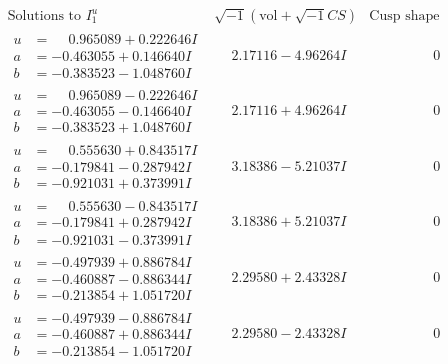\documentclass[1p]{elsarticle_modified}
\theoremstyle{definition}
\newcommand{\I}{\sqrt{-1}}
\begin{document}
$$\begin{array}{c|c|c}  
\text{Solutions to }I^u_{1}& \I (\text{vol} + \sqrt{-1}CS) & \text{Cusp shape}\\
 \hline 
\begin{aligned}
u &= \phantom{-}0.965089 + 0.222646 I \\
a &= -0.463055 + 0.146640 I \\
b &= -0.383523 - 1.048760 I\end{aligned}
 & \phantom{-}2.17116 - 4.96264 I & \phantom{-0.000000 } 0 \\ \hline\begin{aligned}
u &= \phantom{-}0.965089 - 0.222646 I \\
a &= -0.463055 - 0.146640 I \\
b &= -0.383523 + 1.048760 I\end{aligned}
 & \phantom{-}2.17116 + 4.96264 I & \phantom{-0.000000 } 0 \\ \hline\begin{aligned}
u &= \phantom{-}0.555630 + 0.843517 I \\
a &= -0.179841 - 0.287942 I \\
b &= -0.921031 + 0.373991 I\end{aligned}
 & \phantom{-}3.18386 - 5.21037 I & \phantom{-0.000000 } 0 \\ \hline\begin{aligned}
u &= \phantom{-}0.555630 - 0.843517 I \\
a &= -0.179841 + 0.287942 I \\
b &= -0.921031 - 0.373991 I\end{aligned}
 & \phantom{-}3.18386 + 5.21037 I & \phantom{-0.000000 } 0 \\ \hline\begin{aligned}
u &= -0.497939 + 0.886784 I \\
a &= -0.460887 - 0.886344 I \\
b &= -0.213854 + 1.051720 I\end{aligned}
 & \phantom{-}2.29580 + 2.43328 I & \phantom{-0.000000 } 0 \\ \hline\begin{aligned}
u &= -0.497939 - 0.886784 I \\
a &= -0.460887 + 0.886344 I \\
b &= -0.213854 - 1.051720 I\end{aligned}
 & \phantom{-}2.29580 - 2.43328 I & \phantom{-0.000000 } 0 \\ \hline\begin{aligned}

\end{aligned}
\end{array}$$
\end{document}
